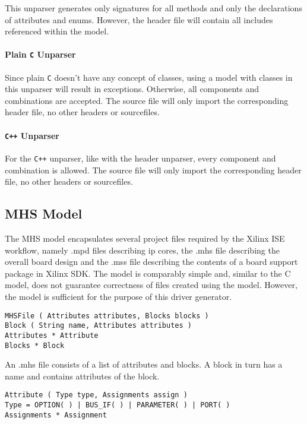 \documentclass{report}
\begin{document}
This unparser generates only signatures for all methods and only the declarations of attributes and enums. However, the header file will contain all includes referenced within the model.

\paragraph{Plain \texttt{C} Unparser}
Since plain \texttt{C} doesn't have any concept of classes, using a model with classes in this unparser will result in exceptions. Otherwise, all components and combinations are accepted. The source file will only import the corresponding header file, no other headers or sourcefiles.

\paragraph{\texttt{C++} Unparser}
For the \texttt{C++} unparser, like with the header unparser, every component and combination is allowed. The source file will only import the corresponding header file, no other headers or sourcefiles.

\subsection{MHS Model}
The MHS model encapsulates several project files required by the Xilinx ISE workflow, namely .mpd files describing ip cores, the .mhs file describing the overall board design and the .mss file describing the contents of a board support package in Xilinx SDK.
The model is comparably simple and, similar to the C model, does not guarantee correctness of files created using the model. However, the model is sufficient for the purpose of this driver generator.

\begin{lstlisting}
MHSFile ( Attributes attributes, Blocks blocks )
Block ( String name, Attributes attributes )
Attributes * Attribute
Blocks * Block
\end{lstlisting}

An .mhs file consists of a list of attributes and blocks. A block in turn has a name and contains attributes of the block.

\begin{lstlisting}
Attribute ( Type type, Assignments assign )
Type = OPTION( ) | BUS_IF( ) | PARAMETER( ) | PORT( )
Assignments * Assignment
\end{lstlisting}
\end{document}
